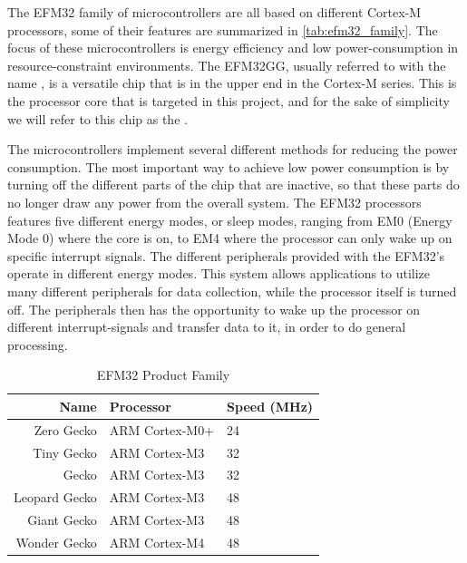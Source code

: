 The EFM32 family of microcontrollers are all based on different Cortex-M processors, some of their features are summarized in \autoref{tab:efm32_family}.
The focus of these microcontrollers is energy efficiency and low power-consumption in resource-constraint environments.
The EFM32GG, usually referred to with the name , is a versatile chip that is in the upper end in the Cortex-M series.
This is the processor core that is targeted in this project, and for the sake of simplicity we will refer to this chip as the {\gecko}.

The microcontrollers implement several different methods for reducing the power consumption.
The most important way to achieve low power consumption is by turning off the different parts of the chip that are inactive, so that these parts do no longer draw any power from the overall system.
The EFM32 processors features five different energy modes, or sleep modes, ranging from EM0 (Energy Mode 0) where the core is on, to EM4 where the processor can only wake up on specific interrupt signals.
The different peripherals provided with the EFM32's operate in different energy modes.
This system allows applications to utilize many different peripherals for data collection, while the processor itself is turned off.
The peripherals then has the opportunity to wake up the processor on different interrupt-signals and transfer data to it, in order to do general processing.

\begin{table}[b]
\begin{center}
    \begin{tabular}{r|l|l}
    \textbf{Name} & \textbf{Processor} & \textbf{Speed (MHz)} \\
    \hline
    Zero Gecko    & ARM Cortex-M0+ & 24 \\
    Tiny Gecko    & ARM Cortex-M3  & 32 \\
    Gecko         & ARM Cortex-M3  & 32 \\
    Leopard Gecko & ARM Cortex-M3  & 48 \\
    Giant Gecko   & ARM Cortex-M3  & 48 \\
    Wonder Gecko  & ARM Cortex-M4  & 48 \\
    \hline
    \end{tabular}
\end{center}
\caption{EFM32 Product Family \cite{web:silabs}}
\label{tab:efm32_family}
\end{table}

